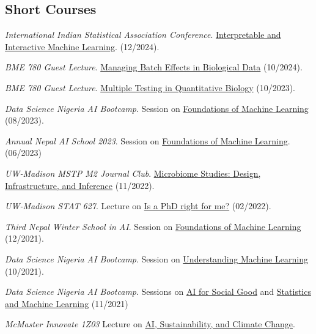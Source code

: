 \documentclass[letterpaper]{article}
\renewenvironment{itemize}{
  \begin{list}{}{
    \setlength{\leftmargin}{1.5em}
  }
}{
  \end{list}
}
\begin{document}
\subsection*{Short Courses}
\begin{itemize}
\item \textit{International Indian Statistical Association Conference}. \href{https://docs.google.com/document/u/1/d/1IIu7lEmvBSqQhB5hQQrmus7JN-g-rCS6_HNcNcphlq8/edit?tab=t.0}{Interpretable and Interactive Machine Learning}. (12/2024).
\item \textit{BME 780 Guest Lecture}. \href{https://krisrs1128.github.io/talks/2024/20241023/20241023.html#1}{Managing Batch Effects in Biological Data} (10/2024).
\item \textit{BME 780 Guest Lecture}. \href{https://krisrs1128.github.io/talks/2023/20231010/20231010.html}{Multiple Testing in Quantitative Biology} (10/2023).
\item \textit{Data Science Nigeria AI Bootcamp}. Session on \href{http://krisrs1128.github.io/dsn_foundations_2023}{Foundations of Machine Learning} (08/2023).
\item \textit{Annual Nepal AI School 2023}. Session on \href{http://krisrs1128.github.io/naamii_summer_2023}{Foundations of Machine Learning}. (06/2023) 
\item \textit{UW-Madison MSTP M2 Journal Club}. \href{https://krisrs1128.github.io/talks/2022/20221128/20221128.html}{Microbiome Studies: Design, Infrastructure, and Inference} (11/2022).
\item \textit{UW-Madison STAT 627}. Lecture on \href{https://drive.google.com/file/d/1kq0xJ3XS98igzxFcJOTFUEz2DtoRByCg/view?usp=sharing}{Is a PhD right for me?} (02/2022).
\item \textit{Third Nepal Winter School in AI}. Session on \href{https://krisrs1128.github.io/winter_school_2021/index.html}{Foundations of Machine Learning} (12/2021).
\item \textit{Data Science Nigeria AI Bootcamp}. Session on \href{https://drive.google.com/file/d/1bgYQb8z1iCjHyOG1gVWeJJCSPdssndVP/view}{Understanding Machine Learning} (10/2021).
\item \textit{Data Science Nigeria AI Bootcamp}. Sessions on \href{https://www.youtube.com/watch?v=7_8DUN-6tpI&}{AI for Social Good} and \href{https://www.youtube.com/watch?v=EefWzpRkIVM}{Statistics and Machine Learning} (11/2021)
\item \textit{McMaster Innovate 1Z03} Lecture on \href{https://docs.google.com/presentation/d/1JWV8_VXYzCzipr6EJZdcdaPY5pz2Cp4F/edit#slide=id.p1}{AI, Sustainability, and Climate Change}.

\end{itemize}
\end{document}
